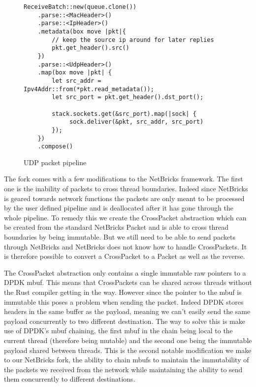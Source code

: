 \documentclass[11pt]{book}
\begin{document}
\begin{figure}[htb!]
\begin{lstlisting}
ReceiveBatch::new(queue.clone())
    .parse::<MacHeader>()
    .parse::<IpHeader>()
    .metadata(box move |pkt|{
        // keep the source ip around for later replies
        pkt.get_header().src()
    })
    .parse::<UdpHeader>()
    .map(box move |pkt| {
        let src_addr = Ipv4Addr::from(*pkt.read_metadata());
        let src_port = pkt.get_header().dst_port();

        stack.sockets.get(&src_port).map(|sock| {
             sock.deliver(&pkt, src_addr, src_port)
        });
    })
    .compose()
\end{lstlisting}

  \label{code:udp-pipeline}
  \caption{UDP packet pipeline}
\end{figure}

The fork comes with a few modifications to the NetBricks
framework. The first one is the inability of packets to cross thread
boundaries. Indeed since NetBricks is geared towards network functions
the packets are only meant to be processed by the user defined
pipeline and is deallocated after it has gone through the whole
pipeline. To remedy this we create the CrossPacket abstraction which
can be created from the standard NetBricks Packet and is able to cross
thread boundaries by being immutable. But we still need to be able to
send packets through NetBricks and NetBricks does not know how to
handle CrossPackets. It is therefore possible to convert a CrossPacket
to a Packet as well as the reverse.

The CrossPacket abstraction only contains a single immutable raw
pointers to a DPDK mbuf. This means that CrossPackets can be shared
across threads without the Rust compiler getting in the way. However
since the pointer to the mbuf is immutable this poses a problem when
sending the packet. Indeed DPDK stores headers in the same buffer as
the payload, meaning we can't easily send the same payload
concurrently to two different destination. The way to solve this is
make use of DPDK's mbuf chaining, the first mbuf in the chain being
local to the current thread (therefore being mutable) and the second
one being the immutable payload shared between threads. This is the
second notable modification we make to our NetBricks fork, the ability
to chain mbufs to maintain the immutability of the packets we received
from the network while maintaining the ability to send them
concurrently to different destinations.
\end{document}
